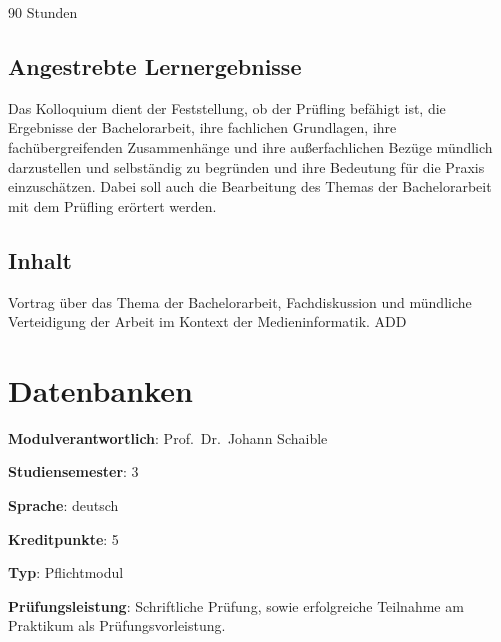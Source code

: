 90 Stunden

\hypertarget{angestrebte-lernergebnissepathlabelmi-2017modulbeschreibungen-bachelorba_bachelorkolloquium}{%
\section*{Angestrebte
Lernergebnisse\label{/mi-2017/modulbeschreibungen-bachelor/BA_Bachelorkolloquium}}\label{angestrebte-lernergebnissepathlabelmi-2017modulbeschreibungen-bachelorba_bachelorkolloquium}}

Das Kolloquium dient der Feststellung, ob der Prüfling befähigt ist, die
Ergebnisse der Bachelorarbeit, ihre fachlichen Grundlagen, ihre
fachübergreifenden Zusammenhänge und ihre außerfachlichen Bezüge
mündlich darzustellen und selbständig zu begründen und ihre Bedeutung
für die Praxis einzuschätzen. Dabei soll auch die Bearbeitung des Themas
der Bachelorarbeit mit dem Prüfling erörtert werden.

\hypertarget{inhaltpathlabelmi-2017modulbeschreibungen-bachelorba_bachelorkolloquium}{%
\section*{Inhalt\label{/mi-2017/modulbeschreibungen-bachelor/BA_Bachelorkolloquium}}\label{inhaltpathlabelmi-2017modulbeschreibungen-bachelorba_bachelorkolloquium}}

Vortrag über das Thema der Bachelorarbeit, Fachdiskussion und mündliche
Verteidigung der Arbeit im Kontext der Medieninformatik. ADD

\hypertarget{datenbankenpathlabelmi-2017modulbeschreibungen-bachelorba_datenbanken1}{%
\chapter{Datenbanken\label{/mi-2017/modulbeschreibungen-bachelor/BA_Datenbanken1}}\label{datenbankenpathlabelmi-2017modulbeschreibungen-bachelorba_datenbanken1}}

\begin{modulHead}
\textbf{Modulverantwortlich}: Prof.~Dr.~Johann
Schaible
\end{modulHead}
\begin{modulHead}
\textbf{Studiensemester}:
3
\end{modulHead}
\begin{modulHead}
\textbf{Sprache}:
deutsch
\end{modulHead}
\begin{modulHead}
\textbf{Kreditpunkte}:
5
\end{modulHead}
\begin{modulHead}
\textbf{Typ}:
Pflichtmodul
\end{modulHead}
\begin{modulHead}
\textbf{Prüfungsleistung}:
Schriftliche Prüfung, sowie erfolgreiche Teilnahme am Praktikum als
Prüfungsvorleistung.
\end{modulHead}


